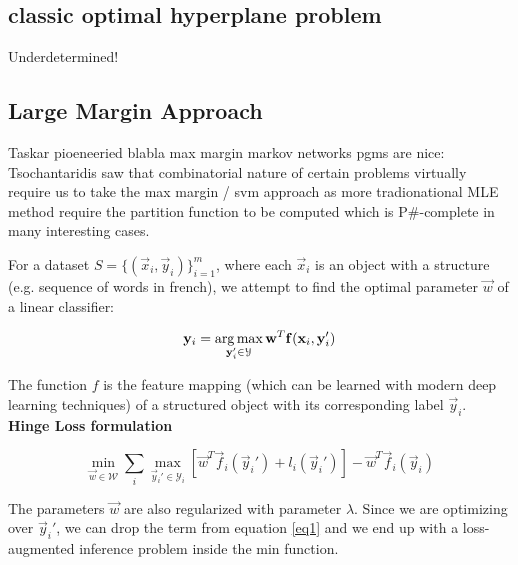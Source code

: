 \subsection{classic optimal hyperplane problem}
Underdetermined!



\clearpage
\subsection{Large Margin Approach}
Taskar pioeneeried blabla max margin markov networks pgms are nice: \cite{taskarMaxMarginMarkovNetworks2004}
Tsochantaridis saw that combinatorial nature of certain problems virtually
require us to take the max margin / svm approach as more tradionational MLE
method require the partition function to be computed which is P\#-complete in
many interesting cases.\cite{tsochantaridisSupportVectorMachine}

For a dataset $ S = \{ (\vec x_i, \vec y_i) \}_{i=1}^{m} $,
where each $\vec x_i$ is an object with a structure (e.g. sequence of words in
french), we attempt to find the optimal parameter $\vec w$ of a linear classifier:

\begin{equation}
  \mathbf y_i = \operatorname*{\arg\max}_{\mathbf y_i' \in \mathcal{Y}} \mathbf w^T \mathbf f(\mathbf x_i,\mathbf y_i')
  \label{eq1}
\end{equation}

The function $f$ is the feature mapping (which can be learned with modern deep
learning techniques) of a structured object with its
corresponding label $\vec y_i$. \textbf{Hinge Loss formulation}

\begin{equation}
  \min_{\vec w \in \mathcal{W}} \sum_i \max_{\vec y_i' \in \mathcal{Y}_i} \left[
\vec w^T \vec f_i(\vec y_i') + l_i(\vec y_i') \right] - \vec w^T \vec f_i(\vec
y_i)
\end{equation}

The parameters $\vec w$ are also regularized with parameter $\lambda$. Since we are
optimizing over $\vec y_i'$, we can drop the term from equation \ref{eq1} and we end
up with a loss-augmented inference problem inside the min function.




